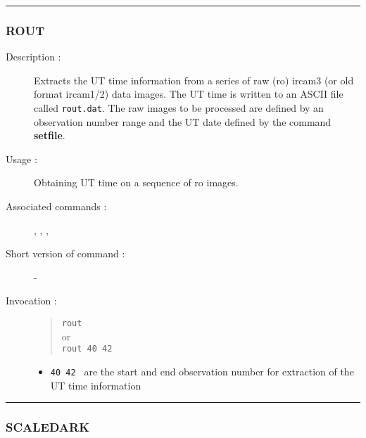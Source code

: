 \hrule
\subsubsection*{\label{ROUT}ROUT}

\begin{description}

\item[Description :] Extracts the UT time information from a series of
raw ({\sc ro}) {\sc ircam3} (or old format {\sc ircam1/2}) data images.
The UT time is written to an ASCII file called {\tt rout.dat}.  The raw
images to be processed are defined by an observation number range and
the UT date defined by the command {\bf setfile}.

\item[Usage :] Obtaining UT time on a sequence of {\sc ro} images.

\item[Associated commands :] {\tt {}},
{\tt {}}, {\tt {}},
{\tt {}}

\item[Short version of command :] -
\item[Invocation :]

\begin{quote}{\tt  rout }\\
or \\
{\tt rout 40 42 }
\end{quote}

\begin{itemize}

\item {\tt 40 42 } are the start and end observation number for
 extraction of the UT time information
\end{itemize}

\end{description}

\hrule
\subsubsection*{\label{SCALEDARK}SCALEDARK}

